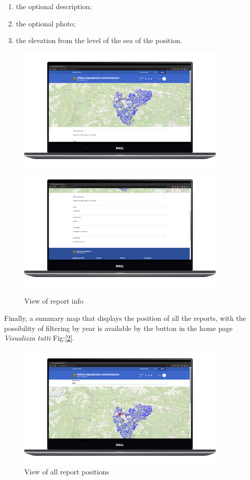 \begin{itemize}
\begin{enumerate}
        \item the optional description;
        \item the optional photo;
        \item the elevation from the level of the sea of the position.
    \end{enumerate}
    \begin{figure}[H] \centering \includegraphics[width=27em]{img/pos_rep.png} \includegraphics[width=27em]{img/dati_rep.png} \caption{View of report info}  \label{reportView} \end{figure}
    Finally, a summary map that displays the position of all the reports, with the possibility of filtering by year is available by the button in the home page \textit{Visualizza tutti} Fig:[\ref{allPositions}].
    \begin{figure}[H]\centering \includegraphics[width=27em]{img/all_reports.png} \caption{View of all report positions} \label{allPositions}\end{figure}
    
\end{itemize}

